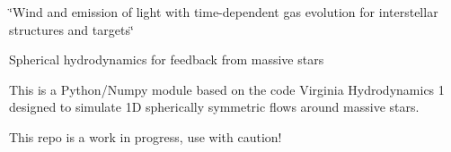 \label{index_md_dump_docs_docsify_README}%
%
\char`\"{}\+Wind and emission of light with time-\/dependent gas evolution for interstellar structures and targets\char`\"{}

Spherical hydrodynamics for feedback from massive stars

This is a Python/\+Numpy module based on the code Virginia Hydrodynamics 1 designed to simulate 1D spherically symmetric flows around massive stars.

This repo is a work in progress, use with caution! 